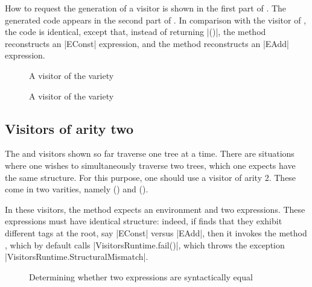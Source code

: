 \documentclass[11pt,a4paper,twoside]{article}
\begin{document}
How to request the generation of a \map visitor is shown in the first part of
. The generated code appears in the second part of
. In comparison with the \iter visitor of ,
the code is identical, except that, instead of returning \oc|()|, the method
 reconstructs an \oc|EConst| expression, and the method
 reconstructs an \oc|EAdd| expression.


\begin{figure}[p]
\vspace{-\baselineskip}
\caption{A visitor of the \itertwo variety}
\label{fig:expr02}
\end{figure}

\begin{figure}[p]
\vspace{-\baselineskip}
\caption{A visitor of the \maptwo variety}
\label{fig:expr03}
\end{figure}

\subsection{Visitors of arity two}
\label{sec:intro:aritytwo}

The \iter and \map visitors shown so far traverse one tree at a time. There
are situations where one wishes to simultaneously traverse two trees, which
one expects have the same structure. For this purpose, one should use a
visitor of arity 2. These come in two varities, namely \itertwo
() and \maptwo ().

In these visitors, the method  expects an environment and
two expressions. These expressions must have identical structure: indeed, if
 finds that they exhibit different tags at the root, say
\oc|EConst| versus \oc|EAdd|, then it invokes the method ,
which by default calls \oc|VisitorsRuntime.fail()|, which throws the exception
\oc|VisitorsRuntime.StructuralMismatch|.

\begin{figure}[t]
\caption{Determining whether two expressions are syntactically equal}
\label{fig:expr05}
\end{figure}
\end{document}
